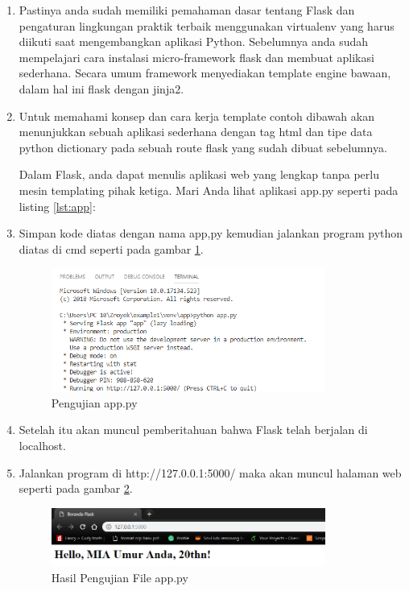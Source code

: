 \begin{enumerate}
\item Pastinya anda sudah memiliki pemahaman dasar tentang Flask dan pengaturan lingkungan praktik terbaik menggunakan virtualenv yang harus diikuti saat mengembangkan aplikasi Python. Sebelumnya anda sudah mempelajari cara instalasi micro-framework flask dan membuat aplikasi sederhana. Secara umum framework menyediakan template engine bawaan, dalam hal ini flask dengan jinja2.   
\item Untuk memahami konsep dan cara kerja template contoh dibawah akan menunjukkan sebuah aplikasi sederhana dengan tag html dan tipe data python dictionary pada sebuah route flask yang sudah dibuat sebelumnya.

Dalam Flask, anda dapat menulis aplikasi web yang lengkap tanpa perlu mesin templating pihak ketiga. Mari  Anda lihat aplikasi app.py seperti pada listing \ref{lst:app}:


\item Simpan kode diatas dengan nama app,py kemudian jalankan program python diatas di cmd seperti pada gambar \ref{fig:uap}.
\begin{figure}[!htbp]
	\centerline{\includegraphics[width=0.85\textwidth]{figures/13/uap.PNG}}
	\caption{Pengujian app.py}
	\label{fig:uap}
\end{figure}

\item Setelah itu akan muncul pemberitahuan bahwa Flask telah berjalan di localhost.
\item Jalankan program di http://127.0.0.1:5000/ maka akan muncul halaman web seperti pada gambar \ref{fig:hufa}.
\begin{figure}[!htbp]
	\centerline{\includegraphics[width=0.85\textwidth]{figures/13/hufa.PNG}}
	\caption{Hasil Pengujian File app.py}
	\label{fig:hufa}
\end{figure}


\end{enumerate}
